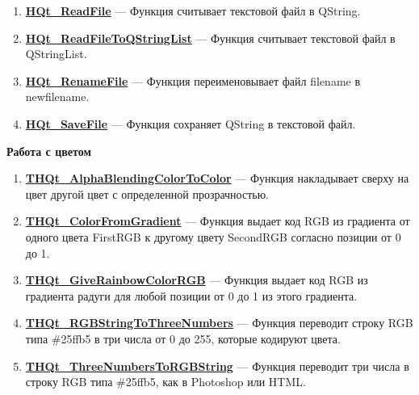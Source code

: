 \documentclass[a4paper,12pt]{article}
\begin{document}
\begin{enumerate}
\item \textbf{\hyperref[HQt_ReadFile]{HQt\_ReadFile}} --- Функция считывает текстовой файл в QString.

\item \textbf{\hyperref[HQt_ReadFileToQStringList]{HQt\_ReadFileToQStringList}} --- Функция считывает текстовой файл в QStringList.

\item \textbf{\hyperref[HQt_RenameFile]{HQt\_RenameFile}} --- Функция переименовывает файл filename в newfilename.

\item \textbf{\hyperref[HQt_SaveFile]{HQt\_SaveFile}} --- Функция сохраняет QString в текстовой файл.

\end{enumerate}

\textbf{Работа с цветом}
\begin{enumerate}

\item \textbf{\hyperref[THQt_AlphaBlendingColorToColor]{THQt\_AlphaBlendingColorToColor}} --- Функция накладывает сверху на цвет другой цвет с определенной прозрачностью.

\item \textbf{\hyperref[THQt_ColorFromGradient]{THQt\_ColorFromGradient}} --- Функция выдает код RGB из градиента от одного цвета FirstRGB к другому цвету SecondRGB согласно позиции от 0 до 1.

\item \textbf{\hyperref[THQt_GiveRainbowColorRGB]{THQt\_GiveRainbowColorRGB}} --- Функция выдает код RGB из градиента радуги для любой позиции от 0 до 1 из этого градиента.

\item \textbf{\hyperref[THQt_RGBStringToThreeNumbers]{THQt\_RGBStringToThreeNumbers}} --- Функция переводит строку RGB типа \#25ffb5 в три числа от 0 до 255, которые кодируют  цвета.

\item \textbf{\hyperref[THQt_ThreeNumbersToRGBString]{THQt\_ThreeNumbersToRGBString}} --- Функция переводит три числа в строку RGB типа \#25ffb5, как в Photoshop или HTML.

\end{enumerate}
\end{document}
